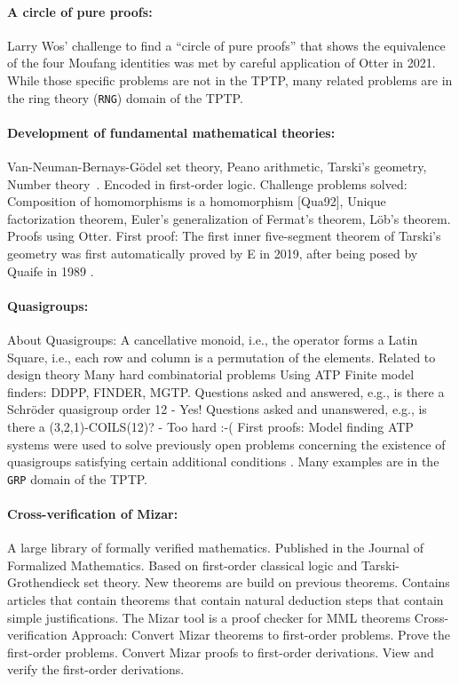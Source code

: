 \documentclass[runningheads]{llncs}
\begin{document}
\paragraph{A circle of pure proofs:}
Larry Wos' challenge to find a ``circle of pure proofs'' that shows the equivalence
of the four Moufang identities \cite{Wos19} was met by careful application \cite{Ver22} of
Otter \cite{McC03-Otter} in 2021.
While those specific problems are not in the TPTP, many related problems are in the
ring theory ({\tt RNG}) domain of the TPTP.

\paragraph{Development of fundamental mathematical theories:}
Van-Neuman-Bernays-Gödel set theory\cite{Qua92-JAR},
Peano arithmetic,
Tarski's geometry,
Number theory~\cite{Qua92-Book}.
Encoded in first-order logic.
Challenge problems solved:
Composition of homomorphisms is a homomorphism [Qua92],
Unique factorization theorem,
Euler's generalization of Fermat's theorem,
Löb's theorem.
Proofs using Otter.
First proof: 
The first inner five-segment theorem of Tarski's geometry \cite{SST83} was first
automatically proved by E \cite{Sch13-LPAR} in 2019, after being posed by Quaife in
1989 \cite{Qua89}.

\paragraph{Quasigroups:}
About Quasigroups: A cancellative monoid, i.e., the operator forms a Latin Square, 
i.e., each row and column is a permutation of the elements.
Related to design theory
Many hard combinatorial problems
Using ATP
Finite model finders: DDPP, FINDER, MGTP.
Questions asked and answered, e.g.,
is there a Schröder quasigroup order 12 - Yes!
Questions asked and unanswered, e.g.,
is there a (3,2,1)-COILS(12)? - Too hard :-(
First proofs: Model finding ATP systems were used to solve previously open problems concerning the
existence of quasigroups satisfying certain additional conditions \cite{SFS95}.
Many examples are in the {\tt GRP} domain of the TPTP.

\paragraph{Cross-verification of Mizar:}
A large library of formally verified mathematics.
Published in the Journal of Formalized Mathematics.
Based on first-order classical logic and Tarski-Grothendieck set theory.
New theorems are build on previous theorems.
Contains articles that contain theorems that contain natural deduction steps that 
contain simple justifications.
The Mizar tool is a proof checker for MML theorems
Cross-verification Approach:
Convert Mizar theorems to first-order problems.
Prove the first-order problems.
Convert Mizar proofs to first-order derivations.
View and verify the first-order derivations.
\end{document}
